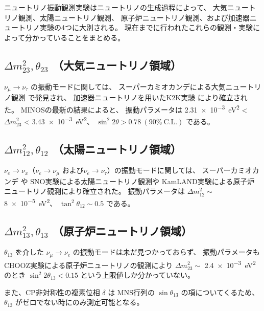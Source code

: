 ニュートリノ振動観測実験はニュートリノの生成過程によって、
大気ニュートリノ観測、太陽ニュートリノ観測、
原子炉ニュートリノ観測、および加速器ニュートリノ実験の4つに大別される。
現在までに行われたこれらの観測・実験によって分かっていることをまとめる。


\subsection{$\Delta m_{23}^{2}, \theta_{23}$ （大気ニュートリノ領域）}

$\nu_{\mu} \rightarrow \nu_{\tau}$ の振動モードに関しては、
スーパーカミオカンデによる大気ニュートリノ観測 \cite{sk_solar} で発見され、
加速器ニュートリノを用いたK2K実験 \cite{k2k} により確立された。
MINOSの最新の結果\cite{minos}によると、
振動パラメータは
\qty{2.31e-3}{\eV\squared} < $\Delta m_{23}^{2}$ < \qty{3.43e-3}{\eV\squared}、
$\sin^{2} 2 \theta > 0.78\ (90 \%\ \mathrm{C.L.})$ である。

\subsection{$\Delta m_{12}^{2}, \theta_{12}$ （太陽ニュートリノ領域）}

$\nu_{e} \rightarrow \nu_{x}$（$\nu_{e} \rightarrow \nu_{\mu}$
および$\nu_{e} \rightarrow \nu_{\tau}$）の振動モードに関しては、
スーパーカミオカンデ \cite{sk-solar}や SNO実験\cite{sno}による太陽ニュートリノ観測や
KamLAND実験\cite{kamland}による原子炉ニュートリノ観測により確立された。
振動パラメータは
$\Delta m_{12}^{2} \sim$ \qty{8e-5}{\eV\squared}、
$\tan^{2}\theta_{12} \sim 0.5$ である。

\subsection{$\Delta m_{13}^{2}, \theta_{13}$ （原子炉ニュートリノ領域）}

$\theta_{13}$ を介した
$\nu_{\mu} \rightarrow \nu_{e}$ の振動モードは未だ見つかっておらず、
振動パラメータもCHOOZ実験による原子炉ニュートリノの観測\cite{chooz}により
$\Delta m_{23}^{2} \sim$ \qty{2.4e-3}{\eV\squared} のとき
$\sin^{2} 2 \theta_{13} < 0.15$ という上限値しか分かっていない。

また、CP非対称性の複素位相 $\delta$ は
MNS行列の $\sin \theta_{13}$ の項についてくるため、
$\theta_{13}$ がゼロでない時にのみ測定可能となる。
